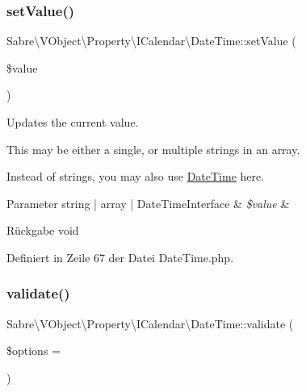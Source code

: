 \subsubsection{\texorpdfstring{set\+Value()}{setValue()}}
{\footnotesize\ttfamily Sabre\textbackslash{}\+V\+Object\textbackslash{}\+Property\textbackslash{}\+I\+Calendar\textbackslash{}\+Date\+Time\+::set\+Value (\begin{DoxyParamCaption}\item[{}]{\$value }\end{DoxyParamCaption})}

Updates the current value.

This may be either a single, or multiple strings in an array.

Instead of strings, you may also use \mbox{\hyperlink{class_sabre_1_1_v_object_1_1_property_1_1_i_calendar_1_1_date_time}{Date\+Time}} here.


\begin{DoxyParams}[1]{Parameter}
string | array | Date\+Time\+Interface & {\em \$value} & \\
\hline
\end{DoxyParams}
\begin{DoxyReturn}{Rückgabe}
void 
\end{DoxyReturn}


Definiert in Zeile 67 der Datei Date\+Time.\+php.

\mbox{\label{class_sabre_1_1_v_object_1_1_property_1_1_i_calendar_1_1_date_time_a5ce5db0cbea8aeb36405c64c8848e3e4}} 
\subsubsection{\texorpdfstring{validate()}{validate()}}
{\footnotesize\ttfamily Sabre\textbackslash{}\+V\+Object\textbackslash{}\+Property\textbackslash{}\+I\+Calendar\textbackslash{}\+Date\+Time\+::validate (\begin{DoxyParamCaption}\item[{}]{\$options = {} }\end{DoxyParamCaption})}

